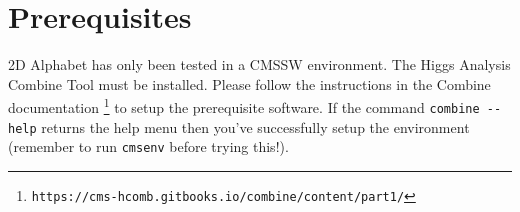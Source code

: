 \documentclass[letter]{article}
\begin{document}
\section{Prerequisites}

    2D Alphabet has only been tested in a CMSSW environment. The Higgs Analysis Combine Tool must be installed. Please follow the instructions in the Combine documentation \footnote{\verb"https://cms-hcomb.gitbooks.io/combine/content/part1/"} to setup the prerequisite software. If the command \verb"combine --help" returns the help menu then you've successfully setup the environment (remember to run \verb"cmsenv" before trying this!).
\end{document}
